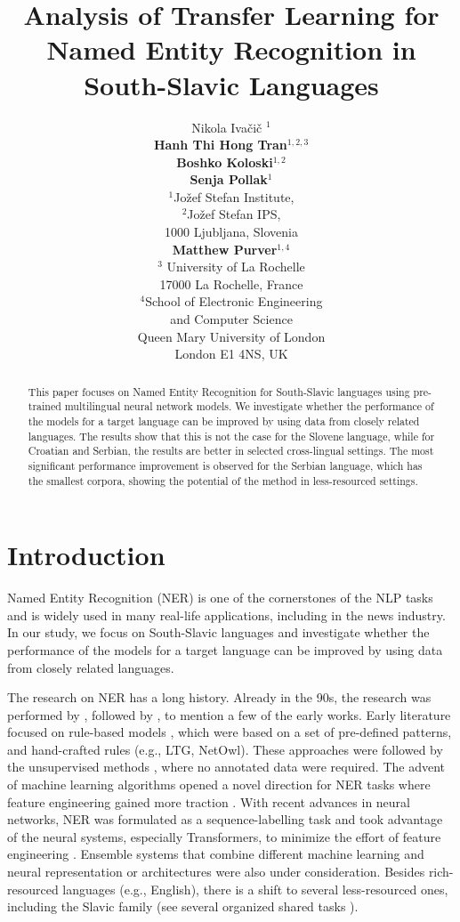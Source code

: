 \documentclass[11pt]{article}
\title{Analysis of Transfer Learning for Named Entity Recognition in South-Slavic Languages}
\author{Nikola Ivačič $^{1}$\\{\bf Hanh Thi Hong Tran$^{1,2,3}$}\\ {\bf Boshko Koloski$^{1,2}$} \\ {\bf Senja Pollak$^{1}$}\\
$^1$Jožef Stefan Institute,\\ $^2$Jožef Stefan IPS, \\ 1000 Ljubljana, Slovenia \\
\And
 \textbf{Matthew Purver$^{1,4}$} \\  
$^3$ University of La Rochelle \\17000 La Rochelle,  France \\
$^4$School of Electronic Engineering\\ and Computer Science\\Queen Mary University of London\\ London E1 4NS, UK
}
\begin{document}
\maketitle

\begin{abstract}
This paper focuses on Named Entity Recognition for South-Slavic languages using pre-trained multilingual neural network models.
We investigate whether the performance of the models for a target language can be improved by using data from closely related languages.
The results show that this is not the case for the Slovene language, while for Croatian and Serbian, the results are better in selected cross-lingual settings.
The most significant performance improvement is observed for the Serbian language, which has the smallest corpora, showing the potential of the method in less-resourced settings.
\end{abstract}


\section{Introduction}
\label{sec:introduction}

Named Entity Recognition (NER) is one of the cornerstones of the NLP tasks and is widely used in many real-life applications, including in the news industry.
In our study, we focus on South-Slavic languages and investigate whether the performance of the models for a target language can be improved by using data from closely related languages.

The research on NER has a long history. Already in the 90s, the research was performed by \citet{grishman1996message}, followed by \citet{sang2003introduction,segura2013semeval}, to mention a few of the early works. 
Early literature focused on rule-based models \cite{yu2020named}, which were based on a set of pre-defined patterns, and hand-crafted rules (e.g., LTG, NetOwl). 
These approaches were followed by the unsupervised methods \cite{collins1999unsupervised,nadeau2006unsupervised}, where no annotated data were required. 
The advent of machine learning algorithms opened a novel direction for NER tasks where feature engineering gained more traction \cite{krishnan2006effective,mansouri2008named,liu2020hamner}. 
With recent advances in neural networks, NER was formulated as a sequence-labelling task and took advantage of the neural systems, especially Transformers, to minimize the effort of feature engineering \cite{lample2016neural,hanh2021named}. 
Ensemble systems that combine different machine learning \cite{ekbal2011weighted,saha2013combining} and neural representation \cite{hanh2021named} or architectures \cite{chiu2016named,liu2018empower} were also under consideration. 
Besides rich-resourced languages (e.g., English), there is a shift to several less-resourced ones, including the Slavic family (see several organized shared tasks \citet{piskorski-etal-2017-first,piskorski-etal-2019-second,piskorski-etal-2021-slav}).
\end{document}
